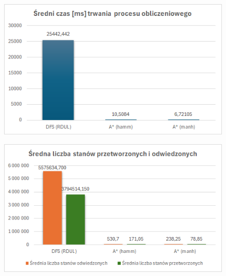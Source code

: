 \documentclass{classrep}
\begin{document}
    \begin{figure}
        \centering
        \includegraphics[width=\textwidth,height=\textheight,keepaspectratio]{average-time-for-big-grapth}
        \caption{}
        \label{fig:6}
    \end{figure}
    \begin{figure}
        \centering
        \includegraphics[width=\textwidth,height=\textheight,keepaspectratio]{average-count-of-visited-for-big-graph}
        \caption{}
        \label{fig:7}
    \end{figure}
\end{document}
